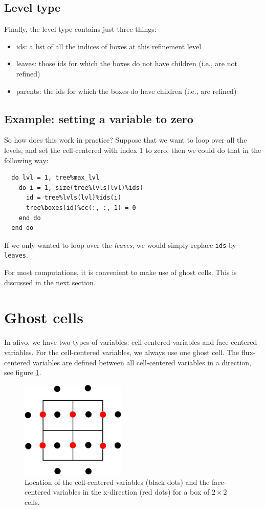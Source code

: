 \documentclass[a4paper, a4wide]{article}
\begin{document}
\subsection{Level type}
\label{sec:level-type}

Finally, the level type contains just three things:
\begin{itemize}
  \item ids: a list of all the indices of boxes at this refinement level
  \item leaves: those ids for which the boxes do not have children (i.e., are
  not refined)
  \item parents: the ids for which the boxes do have children (i.e., are refined)
\end{itemize}

\subsection{Example: setting a variable to zero}
\label{sec:data-types-example}

So how does this work in practice? Suppose that we want to loop over all the
levels, and set the cell-centered with index 1 to zero, then we could do that in
the following way:
\begin{lstlisting}
  do lvl = 1, tree%max_lvl
    do i = 1, size(tree%lvls(lvl)%ids)
      id = tree%lvls(lvl)%ids(i)
      tree%boxes(id)%cc(:, :, 1) = 0
    end do
  end do
\end{lstlisting}
If we only wanted to loop over the \emph{leaves}, we would simply replace \texttt{ids}
by \texttt{leaves}.

For most computations, it is convenient to make use of ghost cells.
This is discussed in the next section.

\section{Ghost cells}
\label{sec:ghost-cells}

In afivo, we have two types of variables: cell-centered variables and
face-centered variables.
For the cell-centered variables, we always use one ghost cell. The flux-centered
variables are defined between all cell-centered variables in a direction, see
figure \ref{fig:location-cc-fx}.

\begin{figure}
  \centering
  \includegraphics[width=5cm]{figures/location_cc_fx.png}
  \caption{Location of the cell-centered variables (black dots) and the
    face-centered variables in the x-direction (red dots) for a box of $2\times
    2$ cells.}
  \label{fig:location-cc-fx}
\end{figure}
\end{document}
